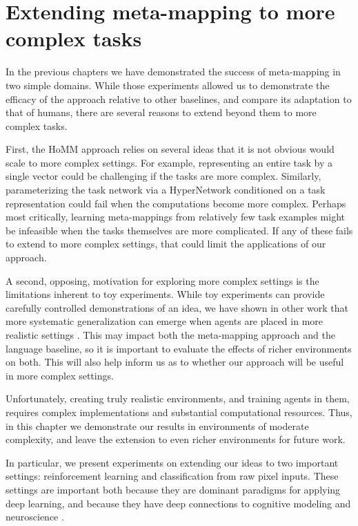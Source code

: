 \chapter{Extending meta-mapping to more complex tasks} \label{chapter:extending}
In the previous chapters we have demonstrated the success of meta-mapping in two simple domains. While those experiments allowed us to demonstrate the efficacy of the approach relative to other baselines, and compare its adaptation to that of humans, there are several reasons to extend beyond them to more complex tasks. \par 
First, the HoMM approach relies on several ideas that it is not obvious would scale to more complex settings. For example, representing an entire task by a single vector could be challenging if the tasks are more complex. Similarly, parameterizing the task network via a HyperNetwork conditioned on a task representation could fail when the computations become more complex. Perhaps most critically, learning meta-mappings from relatively few task examples might be infeasible when the tasks themselves are more complicated. If any of these fails to extend to more complex settings, that could limit the applications of our approach. \par
A second, opposing, motivation for exploring more complex settings is the limitations inherent to toy experiments. While toy experiments can provide carefully controlled demonstrations of an idea, we have shown in other work that more systematic generalization can emerge when agents are placed in more realistic settings \citep{Hill2019a}. This may impact both the meta-mapping approach and the language baseline, so it is important to evaluate the effects of richer environments on both. This will also help inform us as to whether our approach will be useful in more complex settings. \par
Unfortunately, creating truly realistic environments, and training agents in them, requires complex implementations and substantial computational resources. Thus, in this chapter we demonstrate our results in environments of moderate complexity, and leave the extension to even richer environments for future work.\par 
In particular, we present experiments on extending our ideas to two important settings: reinforcement learning and classification from raw pixel inputs. These settings are important both because they are dominant paradigms for applying deep learning, and because they have deep connections to cognitive modeling and neuroscience \citep[e.g.][]{Yamins2014, Kriegeskorte2015, Momennejad2017}. \par

